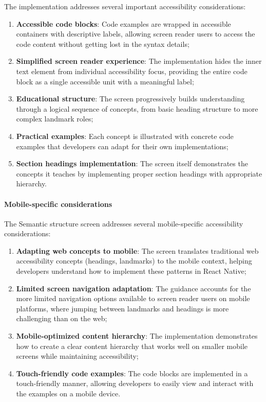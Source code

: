 The implementation addresses several important accessibility considerations:

\begin{enumerate}
    \item \textbf{Accessible code blocks}: Code examples are wrapped in accessible containers with descriptive labels, allowing screen reader users to access the code content without getting lost in the syntax details;
    
    \item \textbf{Simplified screen reader experience}: The implementation hides the inner text element from individual accessibility focus, providing the entire code block as a single accessible unit with a meaningful label;
    
    \item \textbf{Educational structure}: The screen progressively builds understanding through a logical sequence of concepts, from basic heading structure to more complex landmark roles;
    
    \item \textbf{Practical examples}: Each concept is illustrated with concrete code examples that developers can adapt for their own implementations;
    
    \item \textbf{Section headings implementation}: The screen itself demonstrates the concepts it teaches by implementing proper section headings with appropriate hierarchy.
\end{enumerate}

\paragraph{Mobile-specific considerations}

The Semantic structure screen addresses several mobile-specific accessibility considerations:

\begin{enumerate}
    \item \textbf{Adapting web concepts to mobile}: The screen translates traditional web accessibility concepts (headings, landmarks) to the mobile context, helping developers understand how to implement these patterns in React Native;
    
    \item \textbf{Limited screen navigation adaptation}: The guidance accounts for the more limited navigation options available to screen reader users on mobile platforms, where jumping between landmarks and headings is more challenging than on the web;
    
    \item \textbf{Mobile-optimized content hierarchy}: The implementation demonstrates how to create a clear content hierarchy that works well on smaller mobile screens while maintaining accessibility;
    
    \item \textbf{Touch-friendly code examples}: The code blocks are implemented in a touch-friendly manner, allowing developers to easily view and interact with the examples on a mobile device.
\end{enumerate}

